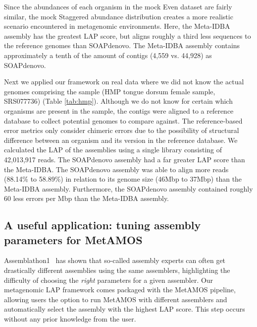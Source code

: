 \documentclass[conference]{IEEEtran}
\begin{document}
Since the abundances of each organism in the mock Even dataset are fairly similar, the mock Staggered abundance distribution creates a more realistic scenario encountered in metagenomic environments.
Here, the Meta-IDBA assembly has the greatest LAP score, but aligns roughly a third less sequences to the reference genomes than SOAPdenovo.
The Meta-IDBA assembly contains approximately a tenth of the amount of contigs (4,559 vs. 44,928) as SOAPdenovo.

Next we applied our framework on real data where we did not know the actual genomes comprising the sample (HMP tongue dorsum female sample, SRS077736) (Table \ref{tab:hmp}).
Although we do not know for certain which organisms are present in the sample, the contigs were aligned to a reference database to collect potential genomes to compare against.
The reference-based error metrics only consider chimeric errors due to the possibility of structural difference between an organism and its version in the reference database.
We calculated the LAP of the assemblies using a single library consisting of 42,013,917 reads.
The SOAPdenovo assembly had a far greater LAP score than the Meta-IDBA.
The SOAPdenovo assembly was able to align more reads (88.14\% to 58.89\%) in relation to its genome size (46Mbp to 37Mbp) than the Meta-IDBA assembly.
Furthermore, the SOAPdenovo assembly contained roughly 60 less errors per Mbp than the Meta-IDBA assembly.



\subsection{A useful application: tuning assembly parameters for MetAMOS}
Assemblathon1~\cite{earl2011assemblathon} has shown that so-called assembly experts can often get drastically different assemblies using the same assemblers, highlighting the difficulty of choosing the \emph{right} parameters for a given assembler.
Our metagenomic LAP framework comes packaged with the MetAMOS pipeline, allowing users the option to run MetAMOS with different assemblers and automatically select the assembly with the highest LAP score.
This step occurs without any prior knowledge from the user.
\end{document}
